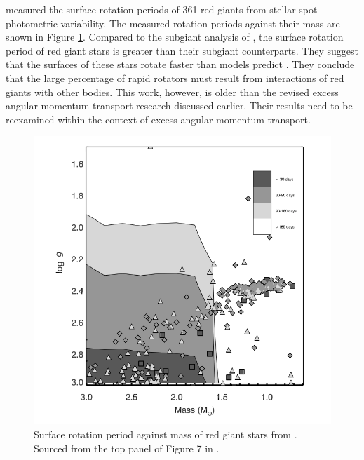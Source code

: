 \citet{ceillier_surface_2017} measured the surface rotation periods of 361 red giants from stellar spot photometric variability.
The measured rotation periods against their mass are shown in Figure \ref{fig:rgb_surface}.
Compared to the subgiant analysis of \citet{santos_surface_2021}, the surface rotation period of red giant stars is greater than their subgiant counterparts.
They suggest that the surfaces of these stars rotate faster than models predict \citep{tayar_rapid_2015}.
They conclude that the large percentage of rapid rotators must result from interactions of red giants with other bodies.
This work, however, is older than the revised excess angular momentum transport research discussed earlier.
Their results need to be reexamined within the context of excess angular momentum transport.

\begin{figure}[h]
    \includegraphics[width=\textwidth]{Figures/intro_figures/rgb_surface.png}
    \caption[Surface rotation period distribution of red giant stars.]{Surface rotation period against mass of red giant stars from \citet{ceillier_surface_2017}.
    Sourced from the top panel of Figure 7 in \citet{ceillier_surface_2017}.}
    \label{fig:rgb_surface}
\end{figure}

